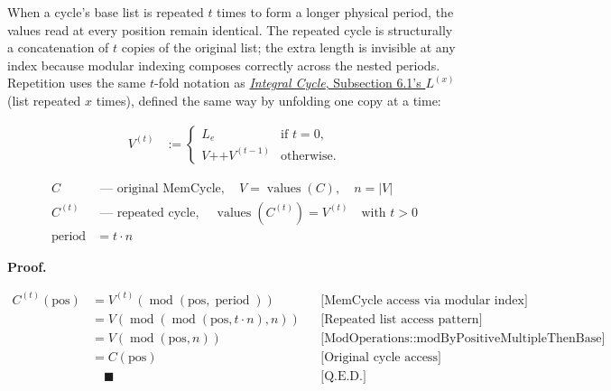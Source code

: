 When a cycle's base list is repeated $t$ times to form a longer physical
period, the values read at every position remain identical. The repeated cycle
is structurally a concatenation of $t$ copies of the original list; the extra
length is invisible at any index because modular indexing composes correctly
across the nested periods. Repetition uses the same $t$-fold notation as
\href{https://github.com/thiagomata/prime-numbers/blob/cycle-article-v1.0.0/articles/chapter4/integral-cycle.md#61-integral-invariance-under-cycle-repetition}{\emph{Integral Cycle}, Subsection 6.1's $L^{(x)}$}
(list repeated $x$ times), defined the same way by unfolding one copy at a
time:

\begin{equation*}
\begin{aligned}
V^{(t)} &:={}
\begin{cases}
L_e & \text{if }t=0, \\
V\mathbin{\texttt{++}}V^{(t-1)} & \text{otherwise}.
\end{cases}
\end{aligned}
\end{equation*}

\begin{equation*}
\begin{aligned}
C &\text{ --- original MemCycle},\quad V=\operatorname{values}(C),
  \quad n=|V| \\
C^{(t)} &\text{ --- repeated cycle},\quad
  \operatorname{values}(C^{(t)})=V^{(t)}\quad\text{with }t>0 \\
\operatorname{period} &=t\cdot n
\end{aligned}
\end{equation*}

\noindent\textbf{Proof.}

\begin{equation*}
\begin{aligned}
C^{(t)}(\text{pos})
  &=V^{(t)}(\operatorname{mod}(\text{pos},\operatorname{period}))
  && \text{[MemCycle access via modular index]} \\
  &=V(\operatorname{mod}(\operatorname{mod}(\text{pos},t\cdot n),n))
  && \text{[Repeated list access pattern]} \\
  &=V(\operatorname{mod}(\text{pos},n))
  && \text{[ModOperations::modByPositiveMultipleThenBase]} \\
  &=C(\text{pos})
  && \text{[Original cycle access]} \\
  &\quad\blacksquare && \text{[Q.E.D.]}
\end{aligned}
\end{equation*}


